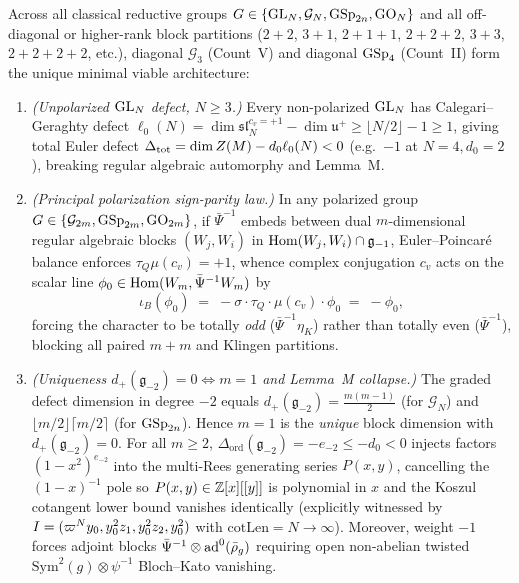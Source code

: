 \begin{theorem}\label{thm:5:4pillar}
\tagProved{}
Across all classical reductive groups $G \in \{\mathrm{GL}_N, \mathcal{G}_N, \mathrm{GSp}_{2n}, \mathrm{GO}_N\}$ and all off-diagonal or higher-rank block partitions ($2+2$, $3+1$, $2+1+1$, $2+2+2$, $3+3$, $2+2+2+2$, etc.), diagonal $\mathcal{G}_3$ (Count~V) and diagonal $\mathrm{GSp}_4$ (Count~II) form the unique minimal viable architecture:
\begin{enumerate}[label=\textbf{Pillar~\arabic*.}]
\item \emph{(Unpolarized $\mathrm{GL}_N$ defect, $N \ge 3$.)} Every non-polarized $\mathrm{GL}_N$ has Calegari--Geraghty defect $\ell_0(N) = \dim \mathfrak{sl}_N^{c_v = +1} - \dim \mathfrak{u}^+ \ge \lfloor N/2 \rfloor - 1 \ge 1$, giving total Euler defect $\Delta_{\mathrm{tot}} = \dim Z(M) - d_0 \ell_0(N) < 0$ (e.g.\ $-1$ at $N=4, d_0=2$), breaking regular algebraic automorphy and Lemma~M.
\item \emph{(Principal polarization sign-parity law.)} In any polarized group $G \in \{\mathcal{G}_{2m}, \mathrm{GSp}_{2m}, \mathrm{GO}_{2m}\}$, if $\bar\Psi^{-1}$ embeds between dual $m$-dimensional regular algebraic blocks $(W_j, W_i)$ in $\mathrm{Hom}(W_j, W_i)\cap\mathfrak{g}_{-1}$, Euler--Poincar\'e balance enforces $\tau_Q \mu(c_v) = +1$, whence complex conjugation $c_v$ acts on the scalar line $\phi_0 \in \mathrm{Hom}(W_m, \bar\Psi^{-1}W_m)$ by
\[
  \iota_B(\phi_0) \;=\; -\sigma \cdot \tau_Q \cdot \mu(c_v) \cdot \phi_0 \;=\; -\phi_0,
\]
forcing the character to be totally \emph{odd} ($\bar\Psi^{-1}\eta_K$) rather than totally even ($\bar\Psi^{-1}$), blocking all paired $m+m$ and Klingen partitions.
\item \emph{(Uniqueness $d_+(\mathfrak{g}_{-2}) = 0 \iff m = 1$ and Lemma~M collapse.)} The graded defect dimension in degree $-2$ equals $d_+(\mathfrak{g}_{-2}) = \frac{m(m-1)}{2}$ (for $\mathcal{G}_N$) and $\lfloor m/2 \rfloor \lceil m/2 \rceil$ (for $\mathrm{GSp}_{2n}$). Hence $m = 1$ is the \emph{unique} block dimension with $d_+(\mathfrak{g}_{-2}) = 0$. For all $m \ge 2$, $\Delta_{\mathrm{ord}}(\mathfrak{g}_{-2}) = -e_{-2} \le -d_0 < 0$ injects factors $(1-x^2)^{e_{-2}}$ into the multi-Rees generating series $P(x,y)$, cancelling the $(1-x)^{-1}$ pole so $P(x,y) \in \mathbb{Z}[x][[y]]$ is polynomial in $x$ and the Koszul cotangent lower bound vanishes identically (explicitly witnessed by $I = (\varpi^N y_0, y_0^2 z_1, y_0^2 z_2, y_0^2)$ with $\mathrm{cotLen} = N \to \infty$). Moreover, weight $-1$ forces adjoint blocks $\bar\Psi^{-1} \otimes \mathrm{ad}^0(\bar\rho_g)$ requiring open non-abelian twisted $\mathrm{Sym}^2(g)\otimes\psi^{-1}$ Bloch--Kato vanishing.

\end{enumerate}
\end{theorem}
